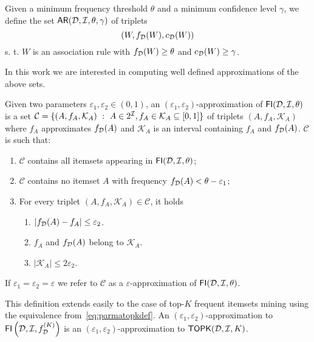 Given a minimum frequency threshold $\theta$ and a minimum confidence level
$\gamma$, we define the set $\mathsf{AR}({\cal D},{\cal I},\theta,\gamma)$ of triplets
\[(W,f_{\cal D}(W),c_{\cal D}(W))\]
s. t. $W$ is an association rule with $f_{\cal D}(W)\ge\theta$ and
$c_{\cal D}(W)\ge\gamma$.

In this work we are interested in computing well defined approximations of the
above sets.

\begin{definition}\label{def:parmaeapproxfi}
  Given two parameters $\varepsilon_1,\varepsilon_2\in(0,1)$, an
  $(\varepsilon_1,\varepsilon_2)$-approximation of
  $\mathsf{FI}({\cal D},{\cal I},\theta)$ is a set $\mathcal{C}=\{(A, f_A, \mathcal{K}_A) ~:~ A\in 2^{\cal I},
  f_A\in\mathcal{K}_A\subseteq[0,1]\}$ of triplets $(A, f_A, \mathcal{K}_A)$ where
  $f_A$ approximates $f_{\cal D}(A)$ and $\mathcal{K}_A$ is an interval containing
  $f_A$ and $f_{\cal D}(A)$.
  $\mathcal{C}$ is such that:
  \begin{enumerate}
    \item $\mathcal{C}$ contains all itemsets appearing in
      $\mathsf{FI}({\cal D},{\cal I},\theta)$;
    \item $\mathcal{C}$ contains no itemset $A$ with frequency $f_{\cal D}(A)<\theta -
      \varepsilon_1$;
    \item For every triplet $(A, f_A,\mathcal{K}_A)\in\mathcal{C}$, it holds
      \begin{enumerate}
       \item $|f_{\cal D}(A)-f_A|\le\varepsilon_2$.
       \item $f_A$ and $f_{\cal D}(A)$ belong to $\mathcal{K}_A$.
       \item $|\mathcal{K}_A|\le 2\varepsilon_2$.
     \end{enumerate}
  \end{enumerate}
  If $\varepsilon_1=\varepsilon_2=\varepsilon$ we refer to $\mathcal{C}$ 
  as a $\varepsilon$-approximation of $\mathsf{FI}({\cal D},{\cal I},\theta)$.
\end{definition} 
This definition extends easily to the case of top-$K$ frequent itemsets mining
using the equivalence from~\eqref{eq:parmatopkdef}. An
$(\varepsilon_1,\varepsilon_2)$-approximation to
$\mathsf{FI}\left({\cal D},{\cal I},f^{(K)}_{\cal D}\right)$ is an
$(\varepsilon_1,\varepsilon_2)$-approximation to $\mathsf{TOPK}({\cal D},{\cal I},K)$.

